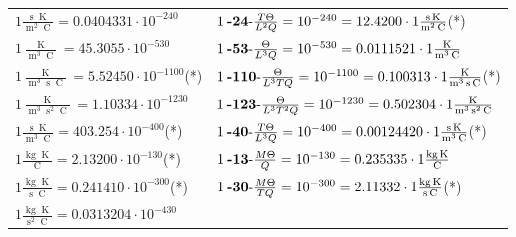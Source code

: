 \begin{center}
\begin{longtable}{l l}
{\color{black}$1 \bm{\mathrm{ }}\frac{\operatorname{s}\operatorname{K}}{\operatorname{m}^2\operatorname{C}} = 0.0404331\cdot10^{-240} $}&
	{\color{black}$1\:\text{\textbf{-24}-} \frac{T\Theta}{L^2Q}=10^{-240} = 12.4200 \cdot 1 \bm{\mathrm{ }}\frac{\operatorname{s}\operatorname{K}}{\operatorname{m}^2\operatorname{C}}$}\quad(*)\\
{\color{black}$1 \bm{\mathrm{ }}\frac{\operatorname{K}}{\operatorname{m}^3\operatorname{C}} = 45.3055\cdot10^{-530} $}&
	{\color{black}$1\:\text{\textbf{-53}-} \frac{\Theta}{L^3Q}=10^{-530} = 0.0111521 \cdot 1 \bm{\mathrm{ }}\frac{\operatorname{K}}{\operatorname{m}^3\operatorname{C}}$}\\
{\color{black}$1 \bm{\mathrm{ }}\frac{\operatorname{K}}{\operatorname{m}^3\operatorname{s}\operatorname{C}} = 5.52450\cdot10^{-1100} $}\quad(*)&
	{\color{black}$1\:\text{\textbf{-110}-} \frac{\Theta}{L^3TQ}=10^{-1100} = 0.100313 \cdot 1 \bm{\mathrm{ }}\frac{\operatorname{K}}{\operatorname{m}^3\operatorname{s}\operatorname{C}}$}\quad(*)\\
{\color{black}$1 \bm{\mathrm{ }}\frac{\operatorname{K}}{\operatorname{m}^3\operatorname{s}^2\operatorname{C}} = 1.10334\cdot10^{-1230} $}&
	{\color{black}$1\:\text{\textbf{-123}-} \frac{\Theta}{L^3T^2Q}=10^{-1230} = 0.502304 \cdot 1 \bm{\mathrm{ }}\frac{\operatorname{K}}{\operatorname{m}^3\operatorname{s}^2\operatorname{C}}$}\\
{\color{black}$1 \bm{\mathrm{ }}\frac{\operatorname{s}\operatorname{K}}{\operatorname{m}^3\operatorname{C}} = 403.254\cdot10^{-400} $}\quad(*)&
	{\color{black}$1\:\text{\textbf{-40}-} \frac{T\Theta}{L^3Q}=10^{-400} = 0.00124420 \cdot 1 \bm{\mathrm{ }}\frac{\operatorname{s}\operatorname{K}}{\operatorname{m}^3\operatorname{C}}$}\quad(*)\\
\hline{\color{black}$1 \bm{\mathrm{ }}\frac{\operatorname{kg}\operatorname{K}}{\operatorname{C}} = 2.13200\cdot10^{-130} $}\quad(*)&
	{\color{black}$1\:\text{\textbf{-13}-} \frac{M\Theta}{Q}=10^{-130} = 0.235335 \cdot 1 \bm{\mathrm{ }}\frac{\operatorname{kg}\operatorname{K}}{\operatorname{C}}$}\\
{\color{black}$1 \bm{\mathrm{ }}\frac{\operatorname{kg}\operatorname{K}}{\operatorname{s}\operatorname{C}} = 0.241410\cdot10^{-300} $}\quad(*)&
	{\color{black}$1\:\text{\textbf{-30}-} \frac{M\Theta}{TQ}=10^{-300} = 2.11332 \cdot 1 \bm{\mathrm{ }}\frac{\operatorname{kg}\operatorname{K}}{\operatorname{s}\operatorname{C}}$}\quad(*)\\
{\color{black}$1 \bm{\mathrm{ }}\frac{\operatorname{kg}\operatorname{K}}{\operatorname{s}^2\operatorname{C}} = 0.0313204\cdot10^{-430} $}&

\end{longtable}
\end{center}
